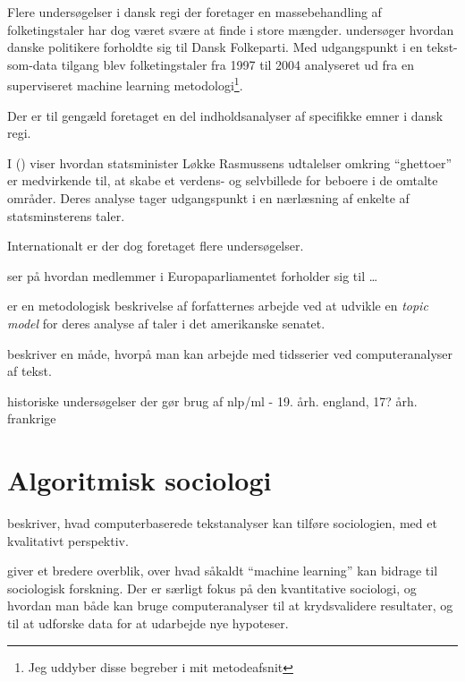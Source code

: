 Flere undersøgelser i dansk regi der foretager en massebehandling af folketingstaler har dog været svære at finde i store mængder.
\citeauthor{hjorthEstablishmentResponsesPopulist} undersøger hvordan danske politikere forholdte sig til Dansk Folkeparti. Med udgangspunkt i en tekst-som-data tilgang blev folketingstaler fra 1997 til 2004 analyseret ud fra en superviseret machine learning metodologi\footnote{Jeg uddyber disse begreber i mit metodeafsnit}.

Der er til gengæld foretaget en del indholdsanalyser af specifikke emner i dansk regi.

I  (\citeyear{andersenTaenkIkkePa2012}) viser \citeauthor{andersenTaenkIkkePa2012} hvordan statsminister Løkke Rasmussens udtalelser omkring “ghettoer” er medvirkende til, at skabe et verdens- og selvbillede for beboere i de omtalte områder.
Deres analyse tager udgangspunkt i en nærlæsning af enkelte af statsminsterens taler.

Internationalt er der dog foretaget flere undersøgelser.

\autocite{prokschPositionTakingEuropean2010} ser på hvordan medlemmer i Europaparliamentet forholder sig til \ldots

\autocite{laverExtractingPolicyPositions2003}

\autocite{quinnHowAnalyzePolitical2010} er en metodologisk beskrivelse af forfatternes arbejde ved at udvikle en \textit{topic model} for deres analyse af taler i det amerikanske senatet.

\autocite{slapinScalingModelEstimating2008} beskriver en måde, hvorpå man kan arbejde med tidsserier ved computeranalyser af tekst.

historiske undersøgelser der gør brug af nlp/ml - 19. årh. england, 17? årh. frankrige

\section{Algoritmisk sociologi}\label{sec:review-compsoc}

\cite{evansMachineTranslationMining2016} beskriver, hvad computerbaserede tekstanalyser kan tilføre sociologien, med et kvalitativt perspektiv. 

 \cite{molinaMachineLearningSociology2019} giver et bredere overblik, over hvad såkaldt “machine learning” kan bidrage til sociologisk forskning.
Der er særligt fokus på den kvantitative sociologi, og hvordan man både kan bruge computeranalyser til at krydsvalidere resultater, og til at udforske data for at udarbejde nye hypoteser.


